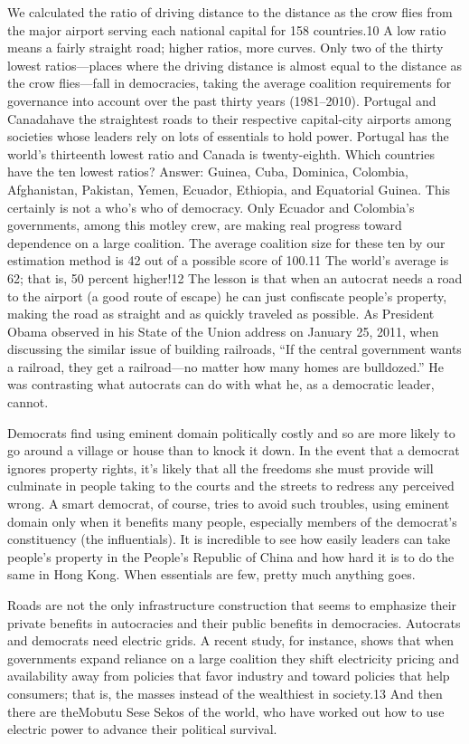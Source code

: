 \documentclass[10pt]{article}
\begin{document}
{\large We calculated the ratio of driving distance to the distance as the crow
flies from the major airport serving each national capital for 158 countries.10 A
low ratio means a fairly straight road; higher ratios, more curves. Only two of
the thirty lowest ratios---places where the driving distance is almost equal to
the distance as the crow flies---fall in democracies, taking the average
coalition requirements for governance into account over the past thirty years
(1981--2010). Portugal and Canadahave the straightest roads to their respective
capital-city airports among societies whose leaders rely on lots of essentials to
hold power. Portugal has the world's thirteenth lowest ratio and Canada is
twenty-eighth. Which countries have the ten lowest ratios? Answer: Guinea, Cuba,
Dominica, Colombia, Afghanistan, Pakistan, Yemen, Ecuador, Ethiopia, and
Equatorial Guinea. This certainly is not a who's who of democracy. Only Ecuador
and Colombia's governments, among this motley crew, are making real progress
toward dependence on a large coalition. The average coalition size for these ten
by our estimation method is 42 out of a possible score of 100.11 The world's
average is 62; that is, 50 percent higher!12 The lesson is that when an autocrat
needs a road to the airport (a good route of escape) he can just confiscate
people's property, making the road as straight and as quickly traveled as
possible. As President Obama observed in his State of the Union address on
January 25, 2011, when discussing the similar issue of building railroads, ``If
the central government wants a railroad, they get a railroad---no matter how many
homes are bulldozed.'' He was contrasting what autocrats can do with what he, as
a democratic leader, cannot.}

{\large Democrats find using eminent domain politically costly and so are more
likely to go around a village or house than to knock it down. In the event that a
democrat ignores property rights, it's likely that all the freedoms she must
provide will culminate in people taking to the courts and the streets to redress
any perceived wrong. A smart democrat, of course, tries to avoid such troubles,
using eminent domain only when it benefits many people, especially members of the
democrat's constituency (the influentials). It is incredible to see how easily
leaders can take people's property in the People's Republic of China and how hard
it is to do the same in Hong Kong. When essentials are few, pretty much anything
goes.}

{\large Roads are not the only infrastructure construction that seems to
emphasize their private benefits in autocracies and their public benefits in
democracies. Autocrats and democrats need electric grids. A recent study, for
instance, shows that when governments expand reliance on a large coalition they
shift electricity pricing and availability away from policies that favor industry
and toward policies that help consumers; that is, the masses instead of the
wealthiest in society.13 And then there are theMobutu Sese Sekos of the world,
who have worked out how to use electric power to advance their political
survival.}
\end{document}
